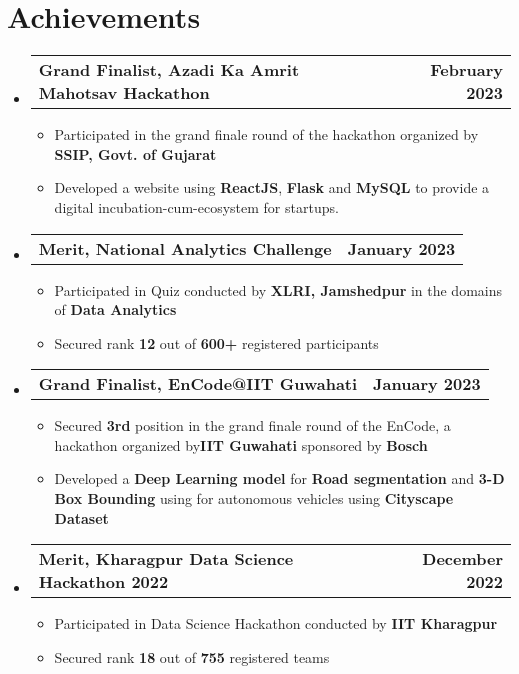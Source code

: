 \documentclass[letterpaper,11pt]{article}
\makeatletter
\newcommand{\resumeItem}[1]{
  \item\small{
    {#1 \vspace{-2pt}}
  }
}
\newcommand{\resumeProjectHeading}[2]{
    \item
    \begin{tabular*}{1.001\textwidth}{l@{\extracolsep{\fill}}r}
      \small#1 & \textbf{\small #2}\\
    \end{tabular*}\vspace{-7pt}
}
\newcommand{\resumeSubHeadingListStart}{\begin{itemize}[leftmargin=0.0in, label={}]}
\newcommand{\resumeSubHeadingListEnd}{\end{itemize}}
\newcommand{\resumeItemListStart}{\begin{itemize}}
\newcommand{\resumeItemListEnd}{\end{itemize}\vspace{-5pt}}
\makeatother
\begin{document}
\section{Achievements}
    \vspace{-2pt}
    \resumeSubHeadingListStart
        \resumeProjectHeading
          {\textbf{Grand Finalist, Azadi Ka Amrit Mahotsav Hackathon}  \emph{}}{February 2023}
          \resumeItemListStart
            \resumeItem{Participated in the grand finale round of the hackathon organized by\textbf{ SSIP, Govt. of Gujarat}}
            \resumeItem{Developed a website using \textbf{ReactJS}, \textbf{Flask} and \textbf{MySQL} to provide a digital incubation-cum-ecosystem for startups.}
          \resumeItemListEnd
          \vspace{-13pt}

        \resumeProjectHeading
          {\textbf{Merit, National Analytics Challenge}  \emph{}}{January 2023}
          \resumeItemListStart
            \resumeItem{Participated in Quiz conducted by \textbf{XLRI, Jamshedpur} in the domains of \textbf{Data Analytics}}
            \resumeItem{Secured rank \textbf{12} out of \textbf{600+} registered participants}
          \resumeItemListEnd
          \vspace{-13pt}
        
        \resumeProjectHeading
          {\textbf{Grand Finalist, EnCode@IIT Guwahati}  \emph{}}{January 2023}
          \resumeItemListStart
            \resumeItem{Secured \textbf{3rd} position in the grand finale round of the EnCode, a hackathon organized by\textbf{IIT Guwahati} sponsored by \textbf{Bosch}}
            \resumeItem{Developed a \textbf{Deep Learning model} for \textbf{Road segmentation} and \textbf{3-D Box Bounding} using for autonomous vehicles using \textbf{Cityscape Dataset}}
          \resumeItemListEnd
          \vspace{-13pt}

          \resumeProjectHeading
          {\textbf{Merit, Kharagpur Data Science Hackathon 2022}  \emph{}}{December 2022}
          \resumeItemListStart
            \resumeItem{Participated in Data Science Hackathon conducted by \textbf{IIT Kharagpur}}
            \resumeItem{Secured rank \textbf{18} out of \textbf{755} registered teams}
          \resumeItemListEnd
          \vspace{-13pt}
 \resumeSubHeadingListEnd
 \vspace{1}
 
\end{document}
